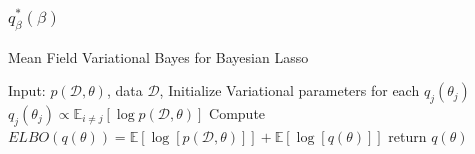 \subsubsection{$q_{\beta}^*(\beta)$}




\begin{algorithm}
	\caption{Mean Field Variational Bayes for Bayesian Lasso}
	\begin{algorithmic}[1]
		
		\State Input: $p(\mathcal{D},\theta)$, data $\mathcal{D}$, Initialize Variational parameters for each $q_j(\theta_j)$
		\State $q_j(\theta_j) \propto \mathbb{E}_{i\neq j}[\log p(\mathcal{D},\theta)]$
		\EndFor
		\State Compute $ELBO(q(\theta)) = \mathbb{E}[\log[p(\mathcal{D},\theta)]] + \mathbb{E}[\log[q(\theta)]]$
		\EndWhile 
		\State return $q(\theta)$
		
		
		
	\end{algorithmic}
\end{algorithm}


